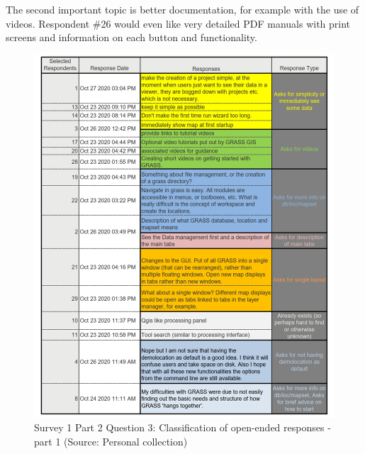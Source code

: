 \documentclass[a4paper,10pt,twoside]{article}
\begin{document}
The second important topic is better documentation, for example with the use of videos. Respondent \#26 would even like very detailed PDF manuals with print screens and information on each button and functionality.

\newpage
\vspace{0.3cm}
\begin{figure}[hbt!] 
\begin{center}
\includegraphics[width=17cm]{../surveys/analyzed_data/survey1_part2_question3_open_ended-2_2.png} 
\caption[Survey 1 Part 2 Question 3: Classification of open-ended responses - part 1]{Survey 1 Part 2 Question 3: Classification of open-ended responses - part 1 (Source: Personal collection)}
\label{fig:survey1_part2_question3_open_ended-1_1}
\end{center}
\end{figure}
\end{document}
